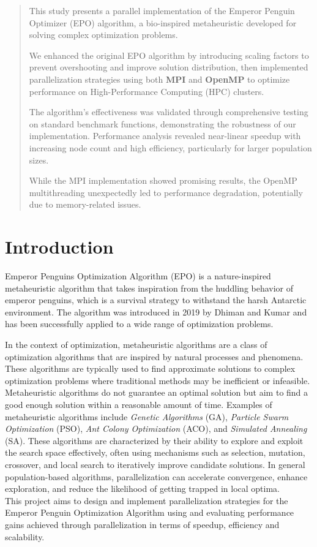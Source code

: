 \documentclass[a4paper,12pt]{article}  %
\begin{document}

\begin{abstract}
This study presents a parallel implementation of the Emperor Penguin Optimizer (EPO) algorithm, a bio-inspired metaheuristic developed for solving complex optimization problems. 

We enhanced the original EPO algorithm by introducing scaling factors to prevent overshooting and improve solution distribution, then implemented parallelization strategies using both \textbf{MPI} and \textbf{OpenMP} to optimize performance on High-Performance Computing (HPC) clusters. 

The algorithm's effectiveness was validated through comprehensive testing on standard benchmark functions, demonstrating the robustness of our implementation. Performance analysis revealed near-linear speedup with increasing node count and high efficiency, particularly for larger population sizes. 

While the MPI implementation showed promising results, the OpenMP multithreading unexpectedly led to performance degradation, potentially due to memory-related issues.
\end{abstract}



\section{Introduction}

Emperor Penguins Optimization Algorithm (EPO) is a nature-inspired  metaheuristic 
algorithm that takes inspiration from the huddling behavior of emperor penguins, which is a survival strategy to withstand the harsh
Antarctic environment. The algorithm was introduced in 2019 by Dhiman and Kumar \cite{dhiman2018emperor} and has been successfully 
applied to a wide range of optimization problems.

In the context of optimization, metaheuristic algorithms are a class of optimization algorithms that are inspired by natural processes and phenomena. 
These algorithms are typically used to find approximate solutions to complex optimization problems where traditional methods may be inefficient or infeasible. 
Metaheuristic algorithms do not guarantee an optimal solution but aim to find a good enough solution within a reasonable amount of time. 
Examples of metaheuristic algorithms include \textit{Genetic Algorithms} (GA), \textit{Particle Swarm Optimization} (PSO), \textit{Ant Colony Optimization} (ACO), and \textit{Simulated Annealing} (SA).
These algorithms are characterized by their ability to explore and exploit the search space effectively, often using mechanisms such as selection, mutation, crossover, and local search to iteratively improve candidate solutions.
In general population-based algorithms, parallelization can accelerate convergence, enhance exploration, and reduce the likelihood of getting trapped in local optima.\\
This project aims to design and implement parallelization strategies for the Emperor Penguin Optimization Algorithm using and evaluating performance gains achieved through parallelization in terms of speedup, efficiency and scalability.
\end{document}
